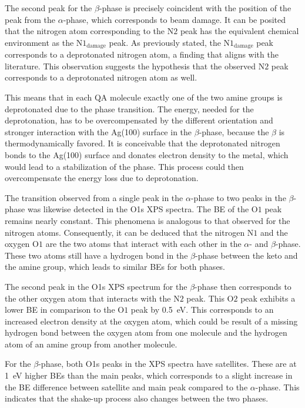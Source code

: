 The second peak for the $\beta$-phase is precisely coincident with the position of the peak from the $\alpha$-phase, which corresponds to beam damage. It can be posited that the nitrogen atom corresponding to the $\mathrm{N2}$ peak has the equivalent chemical environment as the $\mathrm{N1_{damage}}$ peak. As previously stated, the $\mathrm{N1_{damage}}$ peak corresponds to a deprotonated nitrogen atom, a finding that aligns with the literature.\autocite{Kang1990, Ruano2021} This observation suggests the hypothesis that the observed $\mathrm{N2}$ peak corresponds to a deprotonated nitrogen atom as well.

This means that in each \ac{QA} molecule exactly one of the two amine groups is deprotonated due to the phase transition. The energy, needed for the deprotonation, has to be overcompensated by the different orientation and stronger interaction with the Ag(100) surface in the $\beta$-phase, because the $\beta$ is thermodynamically favored.\autocite{Humberg2024} It is conceivable that the deprotonated nitrogen bonds to the Ag(100) surface and donates electron density to the metal, which would lead to a stabilization of the phase. This process could then overcompensate the energy loss due to deprotonation.

The transition observed from a single peak in the $\alpha$-phase to two peaks in the $\beta$-phase was likewise detected in the O1s \ac{XPS} spectra. The \ac{BE} of the $\mathrm{O1}$ peak remains nearly constant. This phenomena is analogous to that observed for the nitrogen atoms. Consequently, it can be deduced that the nitrogen $\mathrm{N1}$ and the oxygen $\mathrm{O1}$ are the two atoms that interact with each other in the $\alpha$- and $\beta$-phase. These two atoms still have a hydrogen bond in the $\beta$-phase between the keto and the amine group, which leads to similar \acp{BE} for both phases.

The second peak in the O1s \ac{XPS} spectrum for the $\beta$-phase then corresponds to the other oxygen atom that interacts with the $\mathrm{N2}$ peak. This $\mathrm{O2}$ peak exhibits a lower \ac{BE} in comparison to the $\mathrm{O1}$ peak by 0.5~\si{\eV}. This corresponds to an increased electron density at the oxygen atom, which could be result of a missing hydrogen bond between the oxygen atom from one molecule and the hydrogen atom of an amine group from another molecule.

For the $\beta$-phase, both O1s peaks in the \ac{XPS} spectra have satellites. These are at 1~\si{\eV} higher \acp{BE} than the main peaks, which corresponds to a slight increase in the \ac{BE} difference between satellite and main peak compared to the $\alpha$-phase. This indicates that the shake-up process also changes between the two phases.

